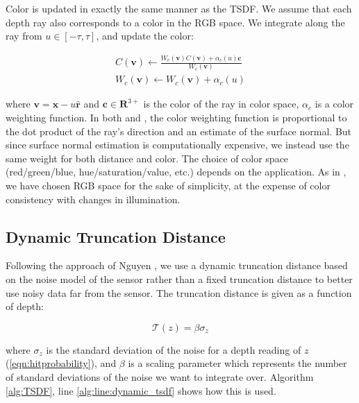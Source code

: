 \documentclass[10pt,twocolumn,letterpaper]{article}
\newcommand{\eref}[1]{(\ref{#1})}
\begin{document}
Color is updated in exactly the same manner as the TSDF. We assume that each
depth ray also corresponds to a color in the RGB space. We integrate along the
ray from $u \in [-\tau, \tau]$, and update the color:

\begin{align}
C(\mathbf{v}) \gets \frac{W_c(\mathbf{v}) C(\mathbf{v}) +
\alpha_c(u) \mathbf{c}}{W_c(\mathbf{v})}
\\
%
W_c(\mathbf{v}) \gets W_c(\mathbf{v}) + \alpha_c(u)
\end{align}

\noindent where $\mathbf{v} = \mathbf{x} - u\mathbf{\hat{r}}$ and $\mathbf{c}
\in \mathbf{R}^{3+}$ is the color of the ray in color space, $\alpha_c$ is a
color weighting function. In both \cite{Bylow2013} and \cite{Whelan2013}, the color weighting function is proportional to the dot
product of the ray's direction and an estimate of the surface normal. But since
surface normal estimation is computationally expensive, we instead use the same
weight for both distance and color. The choice of color space (red/green/blue,
hue/saturation/value, etc.) depends on the application. As in \cite{Bylow2013}, we have chosen RGB space for the sake
of simplicity, at the expense of color consistency with changes in illumination.


\subsection{Dynamic Truncation Distance}
\label{section:dynamic_trunc}
Following the approach of Nguyen \etal\cite{Nguyen2012}, we use a dynamic
truncation distance based on the noise model of the sensor rather than a fixed
truncation distance to better use noisy data far from the sensor. The truncation
distance is given as a function of depth:

\begin{equation} \mathcal{T} (z) = \beta\sigma_{z} \end{equation}

\noindent where $\sigma_{z}$ is the standard deviation of the noise for a depth
reading of $z$ \eref{eqn:hitprobability}, and $\beta$ is a scaling
parameter which represents the number of standard deviations of the noise we
want to integrate over. Algorithm \ref{alg:TSDF}, line
\ref{alg:line:dynamic_tsdf} shows how this is used.
% 
\end{document}
